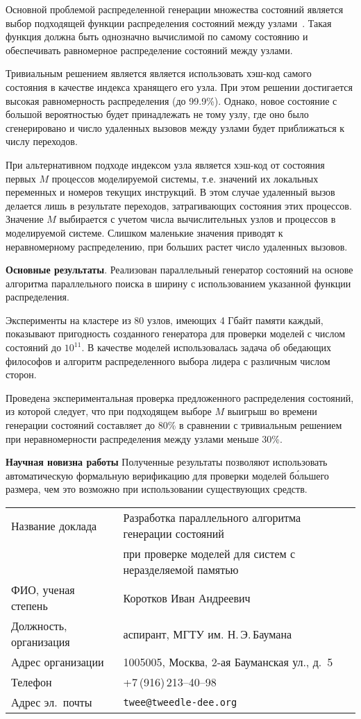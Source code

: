 \documentclass[12pt,a4paper,notitlepage]{article}
\begin{document}
Основной проблемой распределенной генерации множества состояний является выбор подходящей
функции распределения состояний между узлами~\cite{LS99}. Такая функция должна быть
однозначно вычислимой по самому состоянию и обеспечивать равномерное распределение
состояний между узлами.

Тривиальным решением является является использовать хэш-код самого состояния в качестве
индекса хранящего его узла. При этом решении достигается высокая равномерность
распределения (до 99.9\%). Однако, новое состояние с большой вероятностью будет
принадлежать не тому узлу, где оно было сгенерировано и число удаленных вызовов между
узлами будет приближаться к числу переходов.

При альтернативном подходе индексом узла является хэш-код от состояния первых $M$
процессов моделируемой системы, т.е. значений их локальных переменных и номеров текущих
инструкций. В этом случае удаленный вызов делается лишь в результате переходов,
затрагивающих состояния этих процессов. Значение $M$ выбирается с учетом числа
вычислительных узлов и процессов в моделируемой системе. Слишком маленькие значения
приводят к неравномерному распределению, при больших растет число удаленных вызовов.

\textbf{Основные результаты}. Реализован параллельный генератор состояний на основе алгоритма
параллельного поиска в ширину с использованием указанной функции распределения.

Эксперименты на кластере из 80 узлов, имеющих 4 Гбайт памяти каждый, показывают
пригодность созданного генератора для проверки моделей с числом состояний до $10^{11}$. В
качестве моделей использовалась задача об обедающих философов и алгоритм распределенного
выбора лидера с различным числом сторон.

Проведена экспериментальная проверка предложенного распределения состояний, из которой
следует, что при подходящем выборе $M$ выигрыш во времени генерации состояний составляет
до 80\% в сравнении с тривиальным решением при неравномерности распределения между узлами
меньше 30\%.

\textbf{Научная новизна работы} Полученные результаты позволяют использовать
автоматическую формальную верификацию для проверки моделей б\'{о}льшего размера, чем это
возможно при использовании существующих средств.




\newpage

\small
\begin{tabular}{ll}
  Название доклада    & Разработка параллельного алгоритма генерации состояний \\
                      & при проверке моделей для систем с неразделяемой памятью \\
  ФИО, ученая степень & Коротков Иван Андреевич \\
  Должность, организация & аспирант, МГТУ им. Н.\,Э.\,Баумана \\
  Адрес организации & 1005005, Москва, 2-ая Бауманская ул., д.~5 \\
  Телефон           & +7\,(916)\,213--40--98 \\
  Адрес эл.~почты   & \texttt{twee@tweedle-dee.org}
\end{tabular}
\end{document}
